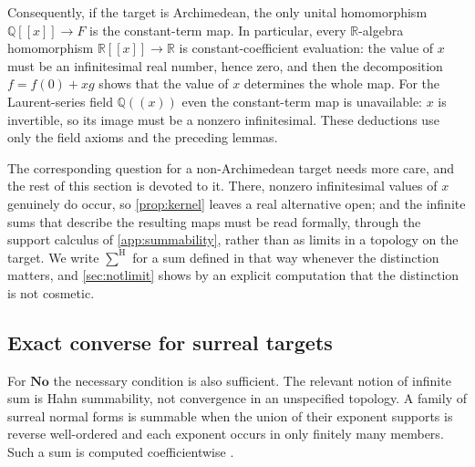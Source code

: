 \documentclass[11pt,letterpaper]{article}
\theoremstyle{definition}
\theoremstyle{remark}
\newcommand{\No}{\mathbf{No}}
\newcommand{\R}{\mathbb R}
\newcommand{\Q}{\mathbb Q}
\newcommand{\seqsum}{\mathop{\sum}\nolimits^{\mathrm H}}
\begin{document}
Consequently, if the target is Archimedean, the only unital homomorphism
$\Q[[x]]\to F$ is the constant-term map. In particular, every $\R$-algebra
homomorphism $\R[[x]]\to\R$ is constant-coefficient evaluation: the value of
$x$ must be an infinitesimal real number, hence zero, and then the
decomposition $f=f(0)+xg$ shows that the value of $x$ determines the whole
map. For the Laurent-series field $\Q((x))$ even the constant-term map is
unavailable: $x$ is invertible, so its image must be a nonzero infinitesimal.
These deductions use only the field axioms and the preceding lemmas.

The corresponding question for a non-Archimedean target needs more care, and
the rest of this section is devoted to it. There, nonzero infinitesimal values
of $x$ genuinely do occur, so \cref{prop:kernel} leaves a real alternative
open; and the infinite sums that describe the resulting maps must be read
formally, through the support calculus of \cref{app:summability}, rather than
as limits in a topology on the target. We write $\seqsum$ for a sum defined in
that way whenever the distinction matters, and \cref{sec:notlimit} shows by an
explicit computation that the distinction is not cosmetic.

\subsection{Exact converse for surreal targets}
For $\No$ the necessary condition is also sufficient. The relevant notion
of infinite sum is Hahn summability, not convergence in an unspecified topology.
A family of surreal normal forms is summable when the union of their exponent
supports is reverse well-ordered and each exponent occurs in only finitely
many members. Such a sum is computed coefficientwise
\citep[Definition 2.9]{BerarducciMantova2018}.
\end{document}
